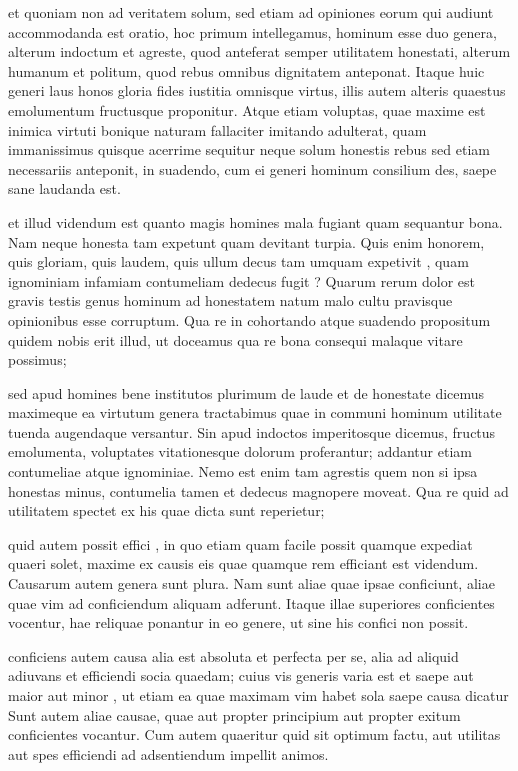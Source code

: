  et quoniam non ad veritatem solum, sed etiam ad opiniones eorum qui audiunt accommodanda est oratio, hoc primum intellegamus, hominum esse duo genera, alterum indoctum et agreste, quod anteferat semper utilitatem honestati, alterum humanum et politum, quod rebus omnibus dignitatem anteponat. Itaque huic generi laus honos gloria fides iustitia omnisque virtus, illis autem alteris quaestus emolumentum fructusque proponitur. Atque etiam voluptas, quae maxime est inimica virtuti bonique naturam fallaciter imitando adulterat, quam immanissimus quisque acerrime sequitur neque solum honestis rebus sed etiam necessariis anteponit, in suadendo, cum ei generi hominum consilium des, saepe sane laudanda est.

 et illud videndum est quanto magis homines mala fugiant quam sequantur bona. Nam neque honesta tam expetunt quam devitant turpia. Quis enim honorem, quis gloriam, quis laudem, quis ullum decus tam umquam expetivit , quam ignominiam infamiam contumeliam dedecus fugit ? Quarum rerum dolor est gravis testis genus hominum ad honestatem natum malo cultu pravisque opinionibus esse corruptum. Qua re in cohortando atque suadendo propositum quidem nobis erit illud, ut doceamus qua re bona consequi malaque vitare possimus;

 sed apud homines bene institutos plurimum de laude et de honestate dicemus maximeque ea virtutum genera tractabimus quae in communi hominum utilitate tuenda augendaque versantur. Sin apud indoctos imperitosque dicemus, fructus emolumenta, voluptates vitationesque dolorum proferantur; addantur etiam contumeliae atque ignominiae. Nemo est enim tam agrestis quem non si ipsa honestas minus, contumelia tamen et dedecus magnopere moveat. Qua re quid ad utilitatem spectet ex his quae dicta sunt reperietur;

 quid autem possit effici , in quo etiam quam facile possit quamque expediat quaeri solet, maxime ex causis eis quae quamque rem efficiant est videndum. Causarum autem genera sunt plura. Nam sunt aliae quae ipsae conficiunt, aliae quae vim ad conficiendum aliquam adferunt. Itaque illae superiores conficientes vocentur, hae reliquae ponantur in eo genere, ut sine his confici non possit.

 conficiens autem causa alia est absoluta et perfecta per se, alia ad aliquid adiuvans et efficiendi socia quaedam; cuius vis generis varia est et saepe aut maior aut minor , ut etiam ea quae maximam vim habet sola saepe causa dicatur Sunt autem aliae causae, quae aut propter principium aut propter exitum conficientes vocantur. Cum autem quaeritur quid sit optimum factu, aut utilitas aut spes efficiendi ad adsentiendum impellit animos.

